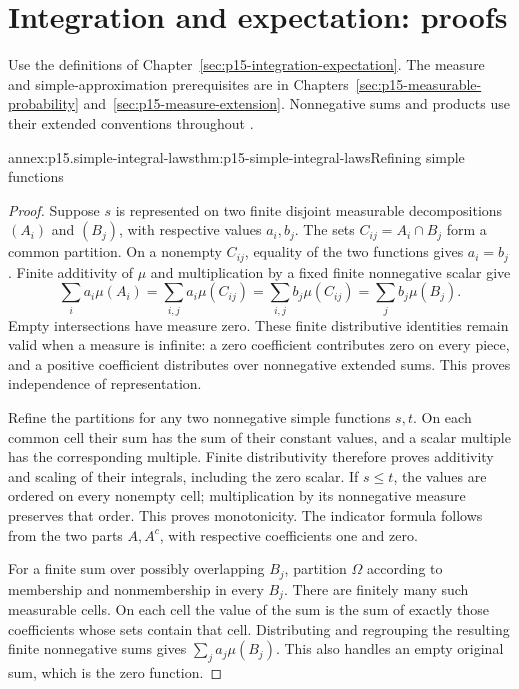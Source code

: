 \section{Integration and expectation: proofs}
\label{sec:annex-p15-integration-expectation}

Use the definitions of Chapter~\ref{sec:p15-integration-expectation}.
The measure and simple-approximation prerequisites are in
Chapters~\ref{sec:p15-measurable-probability}
and~\ref{sec:p15-measure-extension}. Nonnegative sums and products
use their extended conventions throughout
\cite[secs.~1.4--1.6]{DurrettPTEAuthor2019}.

\begin{annexitem}{annex:p15.simple-integral-laws}{thm:p15-simple-integral-laws}{Refining simple functions}
\begin{proof}
Suppose \(s\) is represented on two finite disjoint measurable decompositions
\((A_i)\) and \((B_j)\), with respective values \(a_i,b_j\).
The sets \(C_{ij}=A_i\cap B_j\) form a common partition.
On a nonempty \(C_{ij}\), equality of the two functions gives
\(a_i=b_j\). Finite additivity of \(\mu\) and multiplication
by a fixed finite nonnegative scalar give
\[
 \sum_i a_i\mu(A_i)=\sum_{i,j}a_i\mu(C_{ij})
                 =\sum_{i,j}b_j\mu(C_{ij})=\sum_j b_j\mu(B_j).
\]
Empty intersections have measure zero. These finite distributive
identities remain valid when a measure is infinite: a zero coefficient
contributes zero on every piece, and a positive coefficient distributes
over nonnegative extended sums. This proves independence of representation.

Refine the partitions for any two nonnegative simple functions \(s,t\).
On each common cell their sum has the sum of their constant values,
and a scalar multiple has the corresponding multiple. Finite
distributivity therefore proves additivity and scaling of their integrals,
including the zero scalar. If \(s\leq t\), the values are ordered
on every nonempty cell; multiplication by its nonnegative measure
preserves that order. This proves monotonicity. The indicator formula
follows from the two parts \(A,A^c\), with respective coefficients
one and zero.

For a finite sum over possibly overlapping \(B_j\), partition
\(\Omega\) according to membership and nonmembership in every
\(B_j\). There are finitely many such measurable cells. On each
cell the value of the sum is the sum of exactly those coefficients
whose sets contain that cell. Distributing and regrouping the resulting
finite nonnegative sums gives \(\sum_j a_j\mu(B_j)\). This also
handles an empty original sum, which is the zero function.
\end{proof}
\end{annexitem}


